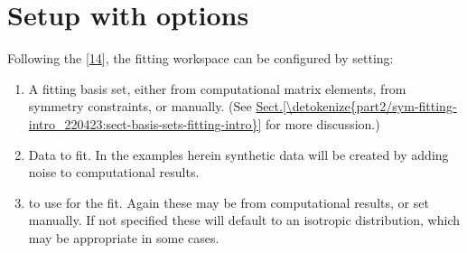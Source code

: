 \documentclass[letterpaper,table,10pt,english]{jupyterBook}
\begin{document}
\section{Setup with options}
\label{\detokenize{part2/basic_fitting_numerics_intro_260423:setup-with-options}}
\sphinxAtStartPar
Following the  {[}\hyperlink{cite.backmatter/bibliography:id667}{14}{]}, the fitting workspace can be configured by setting:
\begin{enumerate}
%
\item {} 
\sphinxAtStartPar
A fitting basis set, either from computational matrix elements, from symmetry constraints, or manually. (See \hyperref[\detokenize{part2/sym-fitting-intro_220423:sect-basis-sets-fitting-intro}]{Sect.\@ \ref{\detokenize{part2/sym-fitting-intro_220423:sect-basis-sets-fitting-intro}}} for more discussion.)

\item {} 
\sphinxAtStartPar
Data to fit. In the examples herein synthetic data will be created by adding noise to computational results.

\item {} 
\sphinxAtStartPar
{\hyperref[\detokenize{backmatter/glossary:term-ADMs}]{}} to use for the fit. Again these may be from computational results, or set manually. If not specified these will default to an isotropic distribution, which may be appropriate in some cases.

\end{enumerate}
\end{document}
